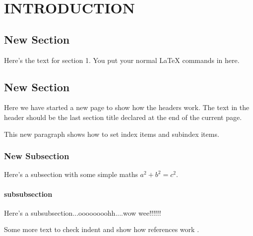 

\chapter[INTRODUCTION]{INTRODUCTION}

\section{New Section}
Here's the text for section 1. You put your normal LaTeX commands
in here.

\newpage
\section{New Section}
Here we have started a new page to show how the headers work. The
text in the header should be the last section title declared at
the end of the current page.

This new paragraph shows how to set index items
and  subindex items.

\subsection{New Subsection}
Here's a subsection with some simple maths $a^2+b^2=c^2$.

\subsubsection{subsubsection}
Here's a subsubsection...oooooooohh....wow
wee!!!!!!

\newpage
Some more text to check indent and show how references work
\cite{Williamson:STS}.

